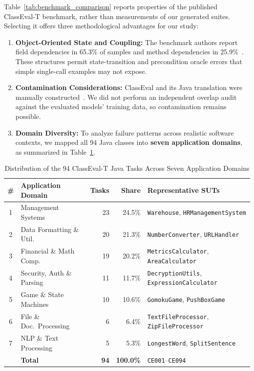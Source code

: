 Table~\ref{tab:benchmark_comparison} reports properties of the published ClassEval-T benchmark, rather than measurements of our generated suites. Selecting it offers three methodological advantages for our study:
\begin{enumerate}
    \item \textbf{Object-Oriented State and Coupling:} The benchmark authors report field dependencies in 65.3\% of samples and method dependencies in 25.9\%~\cite{xue2025classevalt}. These structures permit state-transition and precondition oracle errors that simple single-call examples may not expose.
    \item \textbf{Contamination Considerations:} ClassEval and its Java translation were manually constructed~\cite{du2024classeval,xue2025classevalt}. We did not perform an independent overlap audit against the evaluated models' training data, so contamination remains possible.
    \item \textbf{Domain Diversity:} To analyze failure patterns across realistic software contexts, we mapped all 94 Java classes into \textbf{seven application domains}, as summarized in Table~\ref{tab:domain_distribution}.
\end{enumerate}

\begin{table}[t]
\centering
\caption{Distribution of the 94 ClassEval-T Java Tasks Across Seven Application Domains}
\label{tab:domain_distribution}
\renewcommand{\arraystretch}{1.15}
\setlength{\tabcolsep}{3pt}
\begin{tabular}{clrr>{\raggedright\arraybackslash}p{2.85cm}}
\hline
\textbf{\#} & \textbf{Application Domain} & \textbf{Tasks} & \textbf{Share} & \textbf{Representative SUTs} \\
\hline
1 & Management Systems & 23 & 24.5\% & \texttt{Warehouse}, \texttt{HRManagement\allowbreak System} \\
2 & Data Formatting \& Util. & 20 & 21.3\% & \texttt{Number\allowbreak Converter}, \texttt{URLHandler} \\
3 & Financial \& Math Comp. & 19 & 20.2\% & \texttt{Metrics\allowbreak Calculator}, \texttt{Area\allowbreak Calculator} \\
4 & Security, Auth \& Parsing & 11 & 11.7\% & \texttt{Decryption\allowbreak Utils}, \texttt{Expression\allowbreak Calculator} \\
5 & Game \& State Machines & 10 & 10.6\% & \texttt{GomokuGame}, \texttt{PushBoxGame} \\
6 & File \& Doc.\ Processing & 6 & 6.4\% & \texttt{TextFile\allowbreak Processor}, \texttt{ZipFile\allowbreak Processor} \\
7 & NLP \& Text Processing & 5 & 5.3\% & \texttt{LongestWord}, \texttt{SplitSentence} \\
\hline
 & \textbf{Total} & \textbf{94} & \textbf{100.0\%} & \texttt{CE001}--\texttt{CE094} \\
\hline
\end{tabular}
\end{table}

